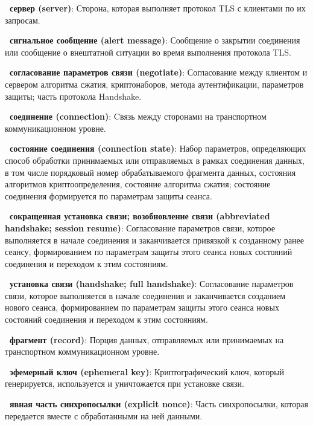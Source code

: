 {\bf \thedefctr~сервер (server)}:
Сторона, которая выполняет протокол TLS с клиентами по их запросам. 

{\bf \thedefctr~сигнальное сообщение (alert message)}:
Сообщение о закрытии соединения или сообщение о внештатной
ситуации во время выполнения протокола TLS. 

{\bf \thedefctr~согласование параметров связи (negotiate)}:
Согласование между клиентом и сервером алгоритма сжатия, криптонаборов, 
метода аутентификации, параметров защиты; часть протокола Handshake. 

{\bf \thedefctr~соединение (connection)}:
Cвязь между сторонами на транспортном коммуникационном уровне. 

{\bf \thedefctr~состояние соединения (connection state)}:
Набор параметров, определяющих способ обработки принимаемых или 
отправляемых в рамках соединения данных, в том числе порядковый номер 
обрабатываемого фрагмента данных, состояния алгоритмов криптоопределения, 
состояние алгоритма сжатия; состояние соединения формируется по 
параметрам защиты сеанса. 

{\bf \thedefctr~сокращенная установка связи; возобновление связи 
(abbreviated handshake; session resume)}: 
Согласование параметров связи, которое выполняется в начале соединения и 
заканчивается привязкой к созданному ранее сеансу, формированием по 
параметрам защиты этого сеанса новых состояний соединения и переходом к 
этим состояниям. 

{\bf \thedefctr~установка связи (handshake; full handshake)}:
Согласование параметров связи, которое выполняется в начале соединения и 
заканчивается созданием нового сеанса, формированием по параметрам защиты 
этого сеанса новых состояний соединения и переходом к этим состояниям. 

{\bf \thedefctr~фрагмент (record)}:
Порция данных, отправляемых или принимаемых на транспортном 
коммуникационном уровне. 

{\bf \thedefctr~эфемерный ключ (ephemeral key)}:
Криптографический ключ, который генерируется, используется и уничтожается 
при установке связи. 

{\bf \thedefctr~явная часть синхропосылки (explicit nonce)}:
Часть синхропосылки, которая передается вместе с обработанными на ней 
данными. 


